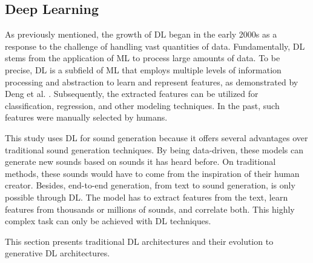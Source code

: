 \subsection{Deep Learning}\label{sec:deep-learning}

As previously mentioned, the growth of \acf{DL} began in the early 2000s as a response to the challenge of handling vast quantities of data. Fundamentally, \ac{DL} stems from the application of \ac{ML} to process large amounts of data. To be precise, \ac{DL} is a subfield of \ac{ML} that employs multiple levels of information processing and abstraction to learn and represent features, as demonstrated by Deng et al. \cite{deng_deep_2014}. Subsequently, the extracted features can be utilized for classification, regression, and other modeling techniques. In the past, such features were manually selected by humans.

This study uses \ac{DL} for sound generation because it offers several advantages over traditional sound generation techniques. By being data-driven, these models can generate new sounds based on sounds it has heard before. On traditional methods, these sounds would have to come from the inspiration of their human creator. Besides, end-to-end generation, from text to sound generation, is only possible through \ac{DL}. The model has to extract features from the text, learn features from thousands or millions of sounds, and correlate both. This highly complex task can only be achieved with \ac{DL} techniques.

This section presents traditional \ac{DL} architectures and their evolution to generative \ac{DL} architectures.




